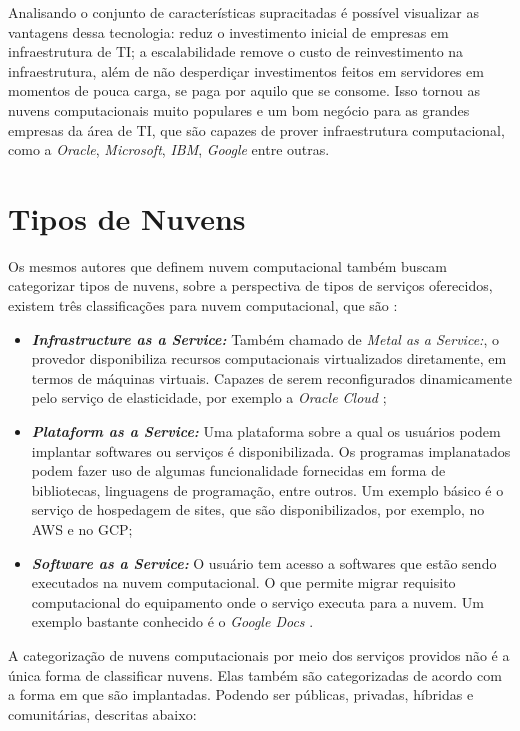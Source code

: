 Analisando o conjunto de características supracitadas é possível visualizar as vantagens dessa tecnologia: reduz o investimento inicial de empresas em infraestrutura de TI; a escalabilidade remove o custo de reinvestimento na infraestrutura, além de não desperdiçar investimentos feitos em servidores em momentos de pouca carga, se paga por aquilo que se consome. Isso tornou as nuvens computacionais muito populares e um bom negócio para as grandes empresas da área de \acrfull{TI}, que são capazes de prover infraestrutura computacional, como a \textit{Oracle}, \textit{Microsoft}, \textit{IBM}, \textit{Google} entre outras.

\section{Tipos de Nuvens}

Os mesmos autores que definem nuvem computacional também buscam categorizar tipos de nuvens, sobre a perspectiva de tipos de serviços oferecidos, existem três classificações para nuvem computacional, que são \cite{NIST_CLOUD_DEFINITION} \cite{Vaquero:2008:BCT:1496091.1496100_Cloud_definition}:

\begin{itemize}
	\item \textbf{\textit{Infrastructure as a Service:}} Também chamado de \textit{Metal as a Service:}, o provedor disponibiliza recursos computacionais virtualizados diretamente, em termos de máquinas virtuais. Capazes de serem reconfigurados dinamicamente pelo serviço de elasticidade, por exemplo a \textit{Oracle Cloud} \cite{OracleCloud};
	\item \textbf{\textit{Plataform as a Service:}} Uma plataforma sobre a qual os usuários podem implantar softwares ou serviços é disponibilizada. Os programas implanatados podem fazer uso de algumas funcionalidade fornecidas em forma de bibliotecas, linguagens de programação, entre outros. Um exemplo básico é o serviço de hospedagem de sites, que são disponibilizados, por exemplo, no \acrfull{AWS} e no \acrfull{GCP};
	\item \textbf{\textit{Software as a Service:}} O usuário tem acesso a softwares que estão sendo executados na nuvem computacional. O que permite migrar requisito computacional do equipamento onde o serviço executa para a nuvem. Um exemplo bastante conhecido é o \textit{Google Docs} \cite{GoogleDocs}.
\end{itemize}

A categorização de nuvens computacionais por meio dos serviços providos não é a única forma de classificar nuvens. Elas também são categorizadas de acordo com a forma em que são implantadas. Podendo ser públicas, privadas, híbridas e comunitárias, descritas abaixo\cite{NIST_CLOUD_DEFINITION}:

